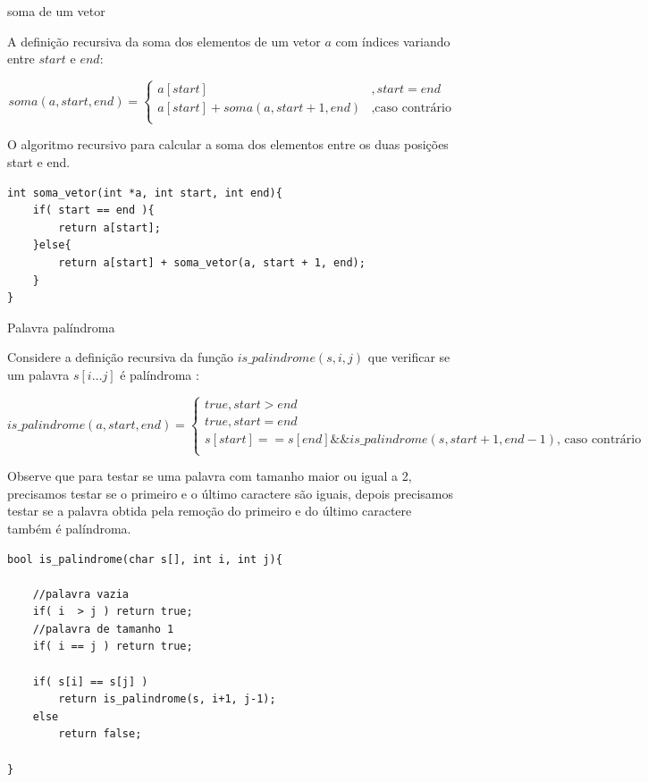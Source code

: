 \begin{exemplo}{soma de um vetor}

A definição recursiva da soma dos elementos de um vetor $a$ com índices variando entre $start$ e $end$:

\begin{equation}
soma(a, start, end) = 
\begin{cases}
a[start]           & , start = end\\
a[start] + soma(a, start+1, end) & , \text{caso contrário}\\

\end{cases}
\end{equation}


O algoritmo recursivo para calcular a soma dos elementos entre os duas posições start e end.

\begin{verbatim}
int soma_vetor(int *a, int start, int end){
	if( start == end ){
		return a[start];
	}else{
		return a[start] + soma_vetor(a, start + 1, end);
	}
}
\end{verbatim}

\end{exemplo}

\begin{exemplo}{Palavra palíndroma}

Considere a definição recursiva da função $is\_palindrome(s,i,j)$  que verificar se um palavra $s[i\ldots j]$ é palíndroma :

\begin{equation}
is\_palindrome(a, start, end) = 
\begin{cases}
true , start > end\\
true , start = end\\
s[start] == s[end] \&\& is\_palindrome(s, start+1, end-1)  \text{, caso contrário}\\

\end{cases}
\end{equation}




Observe que para testar se uma palavra com tamanho maior ou igual a 2, precisamos testar se o primeiro e o último caractere são iguais, depois precisamos testar se a palavra obtida pela remoção do primeiro e do último caractere  também é palíndroma.

\begin{verbatim}
bool is_palindrome(char s[], int i, int j){
    
    //palavra vazia
    if( i  > j ) return true;  
    //palavra de tamanho 1
    if( i == j ) return true; 
    
    if( s[i] == s[j] )
        return is_palindrome(s, i+1, j-1);
    else
        return false;
    
}
\end{verbatim}

\end{exemplo}


